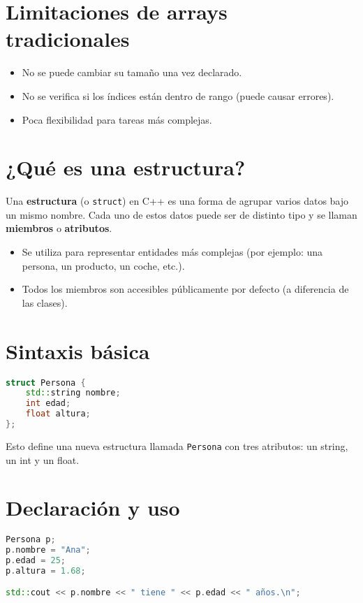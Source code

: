 \documentclass[a4paper]{article}
\begin{document}
\section{Limitaciones de arrays tradicionales}

\begin{itemize}
    \item No se puede cambiar su tamaño una vez declarado.
    \item No se verifica si los índices están dentro de rango (puede causar errores).
    \item Poca flexibilidad para tareas más complejas.
\end{itemize}
\newpage
\section{¿Qué es una estructura?}

Una \textbf{estructura} (o \texttt{struct}) en C++ es una forma de agrupar varios datos bajo un mismo nombre. Cada uno de estos datos puede ser de distinto tipo y se llaman \textbf{miembros} o \textbf{atributos}.

\begin{itemize}
    \item Se utiliza para representar entidades más complejas (por ejemplo: una persona, un producto, un coche, etc.).
    \item Todos los miembros son accesibles públicamente por defecto (a diferencia de las clases).
\end{itemize}

\section{Sintaxis básica}

\begin{lstlisting}[language=C++]
struct Persona {
    std::string nombre;
    int edad;
    float altura;
};
\end{lstlisting}

Esto define una nueva estructura llamada \texttt{Persona} con tres atributos: un string, un int y un float.

\section{Declaración y uso}

\begin{lstlisting}[language=C++]
Persona p;
p.nombre = "Ana";
p.edad = 25;
p.altura = 1.68;

std::cout << p.nombre << " tiene " << p.edad << " años.\n";
\end{lstlisting}
\end{document}

